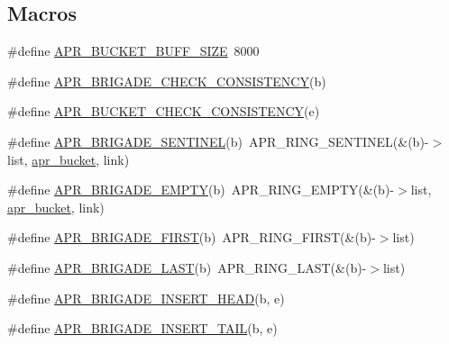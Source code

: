 \subsection*{Macros}
\begin{DoxyCompactItemize}
\item 
\#define \hyperlink{group___a_p_r___util___bucket___brigades_ga82bf404af30875135c65e2c13ad035e5}{A\-P\-R\-\_\-\-B\-U\-C\-K\-E\-T\-\_\-\-B\-U\-F\-F\-\_\-\-S\-I\-Z\-E}~8000
\item 
\#define \hyperlink{group___a_p_r___util___bucket___brigades_gae1dfe8bf117d10e7dc5b8e0c08f0ebb2}{A\-P\-R\-\_\-\-B\-R\-I\-G\-A\-D\-E\-\_\-\-C\-H\-E\-C\-K\-\_\-\-C\-O\-N\-S\-I\-S\-T\-E\-N\-C\-Y}(b)
\item 
\#define \hyperlink{group___a_p_r___util___bucket___brigades_gaedaeb3fbe71aac408377471b8a54dc08}{A\-P\-R\-\_\-\-B\-U\-C\-K\-E\-T\-\_\-\-C\-H\-E\-C\-K\-\_\-\-C\-O\-N\-S\-I\-S\-T\-E\-N\-C\-Y}(e)
\item 
\#define \hyperlink{group___a_p_r___util___bucket___brigades_ga858da66dccab1e063415678bb115788a}{A\-P\-R\-\_\-\-B\-R\-I\-G\-A\-D\-E\-\_\-\-S\-E\-N\-T\-I\-N\-E\-L}(b)~A\-P\-R\-\_\-\-R\-I\-N\-G\-\_\-\-S\-E\-N\-T\-I\-N\-E\-L(\&(b)-\/$>$list, \hyperlink{structapr__bucket}{apr\-\_\-bucket}, link)
\item 
\#define \hyperlink{group___a_p_r___util___bucket___brigades_ga836f61da6cce15074eff257ce4b6fc0f}{A\-P\-R\-\_\-\-B\-R\-I\-G\-A\-D\-E\-\_\-\-E\-M\-P\-T\-Y}(b)~A\-P\-R\-\_\-\-R\-I\-N\-G\-\_\-\-E\-M\-P\-T\-Y(\&(b)-\/$>$list, \hyperlink{structapr__bucket}{apr\-\_\-bucket}, link)
\item 
\#define \hyperlink{group___a_p_r___util___bucket___brigades_gab5826a11eb6ba90786a94282f806c230}{A\-P\-R\-\_\-\-B\-R\-I\-G\-A\-D\-E\-\_\-\-F\-I\-R\-S\-T}(b)~A\-P\-R\-\_\-\-R\-I\-N\-G\-\_\-\-F\-I\-R\-S\-T(\&(b)-\/$>$list)
\item 
\#define \hyperlink{group___a_p_r___util___bucket___brigades_ga40e0ef2a904aa519ca9d63288dee0b4d}{A\-P\-R\-\_\-\-B\-R\-I\-G\-A\-D\-E\-\_\-\-L\-A\-S\-T}(b)~A\-P\-R\-\_\-\-R\-I\-N\-G\-\_\-\-L\-A\-S\-T(\&(b)-\/$>$list)
\item 
\#define \hyperlink{group___a_p_r___util___bucket___brigades_ga6dc39d8757e18941a6fb069b0c18fbd3}{A\-P\-R\-\_\-\-B\-R\-I\-G\-A\-D\-E\-\_\-\-I\-N\-S\-E\-R\-T\-\_\-\-H\-E\-A\-D}(b, e)
\item 
\#define \hyperlink{group___a_p_r___util___bucket___brigades_ga5447595f8374296c5ffe208db39b2f5d}{A\-P\-R\-\_\-\-B\-R\-I\-G\-A\-D\-E\-\_\-\-I\-N\-S\-E\-R\-T\-\_\-\-T\-A\-I\-L}(b, e)
\item 

\end{DoxyCompactItemize}
